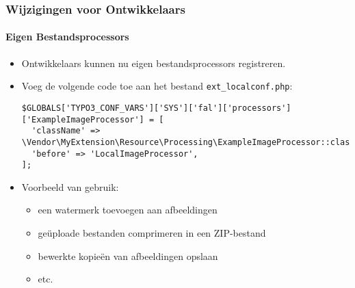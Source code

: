 \begin{frame}[fragile]
	\frametitle{Wijzigingen voor Ontwikkelaars}
	\framesubtitle{Eigen Bestandsprocessors}

	\lstset{basicstyle=\tiny\ttfamily}

	\begin{itemize}
		\item Ontwikkelaars kunnen nu eigen bestandsprocessors registreren.
		\item Voeg de volgende code toe aan het bestand \texttt{ext\_localconf.php}:

\begin{lstlisting}
$GLOBALS['TYPO3_CONF_VARS']['SYS']['fal']['processors']['ExampleImageProcessor'] = [
  'className' => \Vendor\MyExtension\Resource\Processing\ExampleImageProcessor::class,
  'before' => 'LocalImageProcessor',
];
\end{lstlisting}

		\item Voorbeeld van gebruik:

			\begin{itemize}
				\item een watermerk toevoegen aan afbeeldingen
				\item geüploade bestanden comprimeren in een ZIP-bestand
				\item bewerkte kopieën van afbeeldingen opslaan
				\item etc.
			\end{itemize}

	\end{itemize}

\end{frame}


